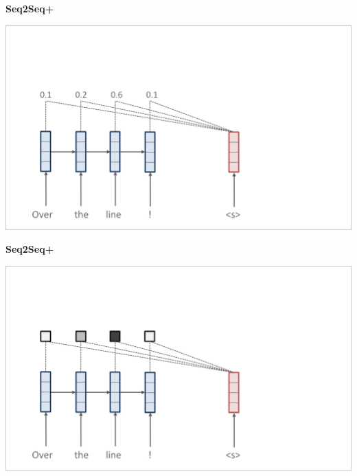 \documentclass[aspectratio=169,12pt]{beamer}
\newcommand{\air}{\vspace{0.25cm}}
\begin{document}
\begin{frame}
  \begin{center}
    \textbf{Seq2Seq+} \air

  \end{center}
\center
\vspace{-5mm}
 \air
\includegraphics[scale=0.37]{nmt-attn2}
\end{frame}
\begin{frame}
  \begin{center}
    \textbf{Seq2Seq+} \air

  \end{center}
\center
\vspace{-5mm}
 \air
\includegraphics[scale=0.37]{nmt-attn3}
\end{frame}
\end{document}
